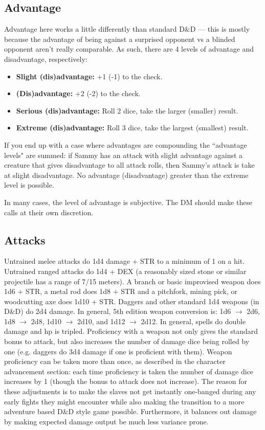 \documentclass[letterpaper,12pt]{article}
\begin{document}
\subsection{Advantage}

Advantage here works a little differently than standard D\&D --- this is mostly because the advantage of being against a surprised opponent vs a blinded opponent aren't really comparable. As such, there are 4 levels of advantage and disadvantage, respectively: 

\begin{itemize}
\item \textbf{Slight (dis)advantage:} +1 (-1) to the check.
\item \textbf{(Dis)advantage:} +2 (-2) to the check. 
\item \textbf{Serious (dis)advantage:} Roll 2 dice, take the larger (smaller) result.
\item \textbf{Extreme (dis)advantage:} Roll 3 dice, take the largest (smallest) result.
\end{itemize}

If you end up with a case where advantages are compounding the ``advantage levels" are summed: if Sammy has an attack with slight advantage against a creature that gives disadvantage to all attack rolls, then Sammy's attack is take at slight disadvantage. No advantage (disadvantage) greater than the extreme level is possible.   

In many cases, the level of advantage is subjective. The DM should make these calls at their own discretion.

\subsection{Attacks}

 Untrained melee attacks do 1d4 damage + STR to a minimum of 1 on a hit. Untrained ranged attacks do 1d4 + DEX (a reasonably sized stone or similar projectile has a range of 7/15 meters). A branch or basic improvised weapon does 1d6 + STR, a metal rod does 1d8 + STR and a pitchfork, mining pick, or woodcutting axe does 1d10 + STR. Daggers and other standard 1d4 weapons (in D\&D) do 2d4 damage. In general, 5th edition weapon conversion is: 1d6 $\rightarrow$ 2d6, 1d8 $\rightarrow$ 2d8, 1d10 $\rightarrow$ 2d10, and 1d12 $\rightarrow$ 2d12. In general, spells do double damage and hp is tripled. Proficiency with a weapon not only gives the standard bonus to attack, but also increases the number of damage dice being rolled by one (e.g. daggers do 3d4 damage if one is proficient with them). Weapon proficiency can be taken more than once, as described in the character advancement section: each time proficiency is taken the number of damage dice increases by 1 (though the bonus to attack does not increase). The reason for these adjustments is to make the slaves not get instantly one-banged during any early fights they might encounter while also making the transition to a more adventure based D\&D style game possible. Furthermore, it balances out damage by making expected damage output be much less variance prone. 
\end{document}
